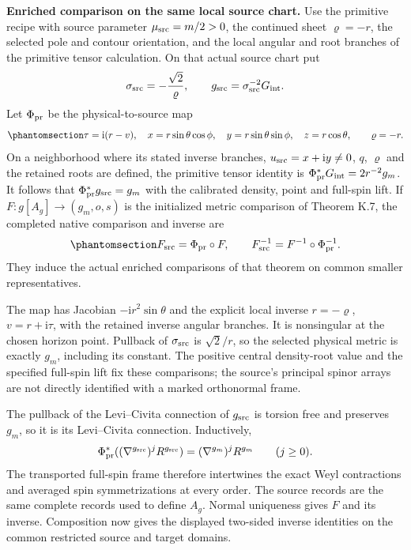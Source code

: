 \documentclass[
  english,
  11pt,
  reqno]{amsart}
\begin{document}
\textbf{Enriched comparison on the same local source chart.} Use the
primitive recipe with source parameter \(\mu_{\rm src}=m/2>0\), the
continued sheet \(\varrho=-r\), the selected pole and contour
orientation, and the local angular and root branches of the primitive
tensor calculation. On that actual source chart put \[
 \sigma_{\rm src}=-\frac{\sqrt2}{\varrho},\qquad
 g_{\rm src}=\sigma_{\rm src}^{-2}G_{\rm int}.
\] Let \(\Phi_{\rm pr}\) be the physical-to-source map
\begin{equation}\protect\phantomsection\label{eq:schw-bc-native-chart-map}{
 \tau=\mathrm i(r-v),\quad
 x=r\sin\theta\cos\phi,\quad
 y=r\sin\theta\sin\phi,\quad
 z=r\cos\theta,
 \qquad\varrho=-r.
}\end{equation} On a neighborhood where its stated inverse branches,
\(u_{\rm src}=x+\mathrm iy\ne0\), \(q\), \(\varrho\) and the retained
roots are defined, the primitive tensor identity is
\(\Phi_{\rm pr}^*G_{\rm int}=2r^{-2}g_m\). It follows that
\(\Phi_{\rm pr}^*g_{\rm src}=g_m\) with the calibrated density, point
and full-spin lift. If \(F:g[A_g]\to(g_m,o,s)\) is the initialized
metric comparison of Theorem K.7, the completed native comparison and
inverse are
\begin{equation}\protect\phantomsection\label{eq:schw-bc-native-generated-composite}{
 F_{\rm src}=\Phi_{\rm pr}\circ F,\qquad
 F_{\rm src}^{-1}=F^{-1}\circ\Phi_{\rm pr}^{-1}.
}\end{equation} They induce the actual enriched comparisons of that
theorem on common smaller representatives.

The map has Jacobian \(-\mathrm ir^2\sin\theta\) and the explicit local
inverse \(r=-\varrho\), \(v=r+\mathrm i\tau\), with the retained inverse
angular branches. It is nonsingular at the chosen horizon point.
Pullback of \(\sigma_{\rm src}\) is \(\sqrt2/r\), so the selected
physical metric is exactly \(g_m\), including its constant. The positive
central density-root value and the specified full-spin lift fix these
comparisons; the source's principal spinor arrays are not directly
identified with a marked orthonormal frame.

The pullback of the Levi--Civita connection of \(g_{\rm src}\) is
torsion free and preserves \(g_m\), so it is its Levi--Civita
connection. Inductively, \[
 \Phi_{\rm pr}^*((\nabla^{g_{\rm src}})^jR^{g_{\rm src}})
       =(\nabla^{g_m})^jR^{g_m}\qquad(j\ge0).
\] The transported full-spin frame therefore intertwines the exact Weyl
contractions and averaged spin symmetrizations at every order. The
source records are the same complete records used to define \(A_g\).
Normal uniqueness gives \(F\) and its inverse. Composition now gives the
displayed two-sided inverse identities on the common restricted source
and target domains.
\end{document}
